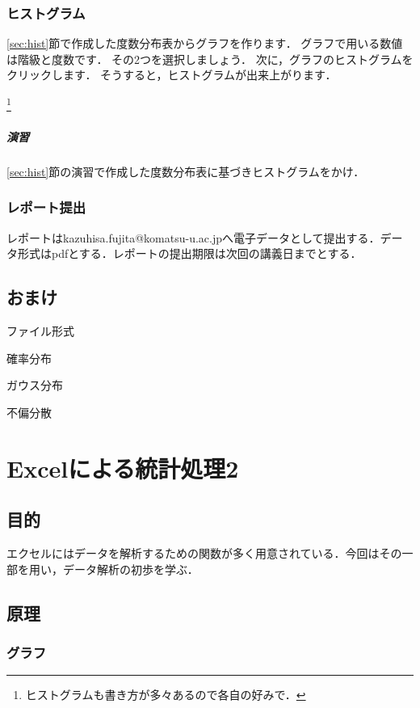\documentclass[12pt, a4j]{jsreport}
\begin{document}
\subsection{ヒストグラム}

\ref{sec:hist}節で作成した度数分布表からグラフを作ります．
グラフで用いる数値は階級と度数です．
その2つを選択しましょう．
次に，グラフのヒストグラムをクリックします．
そうすると，ヒストグラムが出来上がります．

\footnote{ヒストグラムも書き方が多々あるので各自の好みで．}

\paragraph{演習}

\ref{sec:hist}節の演習で作成した度数分布表に基づきヒストグラムをかけ．


\subsection{レポート提出}

レポートはkazuhisa.fujita@komatsu-u.ac.jpへ電子データとして提出する．データ形式はpdfとする．レポートの提出期限は次回の講義日までとする．

\section{おまけ}

ファイル形式

確率分布

ガウス分布

不偏分散


\chapter{Excelによる統計処理2}

\section{目的}

エクセルにはデータを解析するための関数が多く用意されている．今回はその一部を用い，データ解析の初歩を学ぶ．

\section{原理}

\subsection{グラフ}
\end{document}
